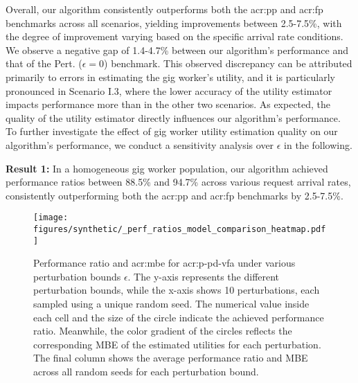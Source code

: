 Overall, our algorithm consistently outperforms both the \gls{acr:pp} and \gls{acr:fp} benchmarks across all scenarios, yielding improvements between 2.5-7.5\%, with the degree of improvement varying based on the specific arrival rate conditions. We observe a negative gap of 1.4-4.7\% between our algorithm's performance and that of the Pert. ($\epsilon=0$) benchmark. This observed discrepancy can be attributed primarily to errors in estimating the gig worker's utility, and it is particularly pronounced in Scenario I.3, where the lower accuracy of the utility estimator impacts performance more than in the other two scenarios. As expected, the quality of the utility estimator directly influences our algorithm's performance. To further investigate the effect of gig worker utility estimation quality on our algorithm's performance, we conduct a sensitivity analysis over $\epsilon$ in the following.

\noindent \textbf{Result 1:} In a homogeneous gig worker population, our algorithm achieved performance ratios between 88.5\% and 94.7\% across various request arrival rates, consistently outperforming both the \gls{acr:pp} and \gls{acr:fp} benchmarks by 2.5-7.5\%. 

\begin{figure}[t!]%
    \centering
    \fontsize{10}{10}\selectfont
    \texttt{[image: figures/synthetic/\_perf\_ratios\_model\_comparison\_heatmap.pdf]}%
    \caption{\textnormal{Performance ratio and \gls{acr:mbe} for \gls{acr:p-pd-vfa} under various perturbation bounds $\epsilon$. The y-axis represents the different perturbation bounds, while the x-axis shows 10 perturbations, each sampled using a unique random seed. The numerical value inside each cell and the size of the circle indicate the achieved performance ratio. Meanwhile, the color gradient of the circles reflects the corresponding MBE of the estimated utilities for each perturbation. The final column shows the average performance ratio and MBE across all random seeds for each perturbation bound.}}
    \label{fig:sens_syn}%
\end{figure}

